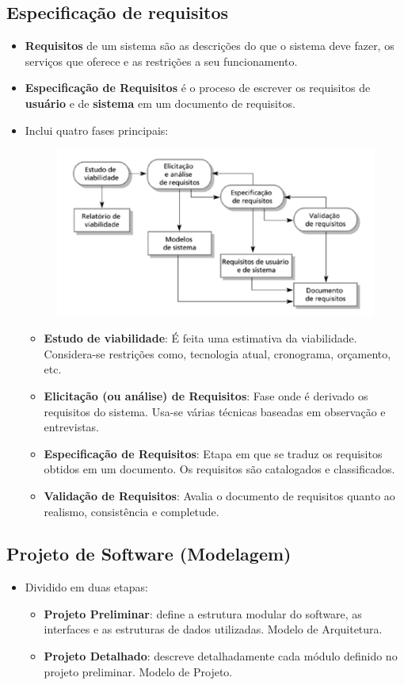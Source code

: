 \documentclass[a4paper, 11pt]{article}
\begin{document}
\subsection{Especificação de requisitos}
\begin{itemize}
	\item \textbf{Requisitos} de um sistema são as descrições do que o sistema deve fazer, os serviços que oferece e as restrições a seu funcionamento.
	\item \textbf{Especificação de Requisitos} é o proceso de escrever os requisitos de \textbf{usuário} e de \textbf{sistema} em um documento de requisitos.
	\item Inclui quatro fases principais:
	\begin{figure}[h]
		\includegraphics[width=12cm]{fases_espec_req}
		\centering
	\end{figure}
	\begin{itemize}
		\item \textbf{Estudo de viabilidade}: É feita uma estimativa da viabilidade. Considera-se restrições como, tecnologia atual, cronograma, orçamento, etc.
		\item \textbf{Elicitação (ou análise) de Requisitos}: Fase onde é derivado os requisitos do sistema. Usa-se várias técnicas baseadas em observação e entrevistas.
		\item \textbf{Especificação de Requisitos}: Etapa em que se traduz os requisitos obtidos em um documento. Os requisitos são catalogados e classificados.
		\item \textbf{Validação de Requisitos}: Avalia o documento de requisitos quanto ao realismo, consistência e completude. 
	\end{itemize}
\end{itemize}

\subsection{Projeto de Software (Modelagem)}
\begin{itemize}
	\item Dividido em duas etapas:
	\begin{itemize}
		\item \textbf{Projeto Preliminar}: define a estrutura modular do software, as interfaces e as estruturas de dados utilizadas. Modelo de Arquitetura.
		\item \textbf{Projeto Detalhado}: descreve detalhadamente cada módulo definido no projeto preliminar. Modelo de Projeto.
	\end{itemize}
\end{itemize}
\end{document}
